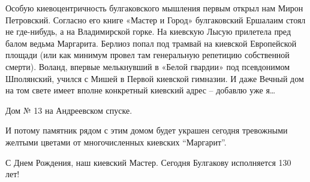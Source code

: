 Особую киевоцентричность булгаковского мышления первым открыл нам
Мирон Петровский. Согласно его книге «Мастер и Город» булгаковский
Ершалаим стоял не где-нибудь, а на Владимирской горке. На киевскую
Лысую прилетела пред балом ведьма Маргарита. Берлиоз попал под трамвай
на киевской Европейской площади (или как минимум провел там
генеральную репетицию собственной смерти). Воланд, впервые мелькнувший
в «Белой гвардии» под псевдонимом Шполянский, учился с Мишей в Первой
киевской гимназии.  И даже Вечный дом на том свете имеет вполне
конкретный киевский адрес – добавлю уже я… 

Дом № 13 на Андреевском спуске. 

И потому памятник рядом с этим домом будет украшен сегодня тревожными желтыми цветами от многочисленных киевских \enquote{Маргарит}.

С Днем Рождения, наш киевский Мастер. 
Сегодня Булгакову исполняется 130 лет!
